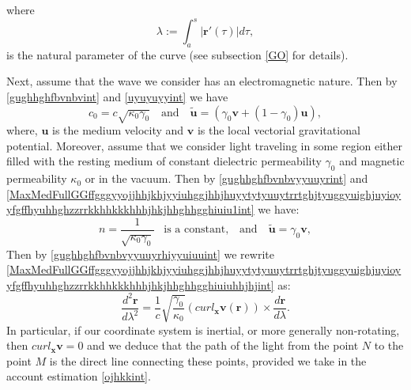 \documentclass{article}
\theoremstyle{definition}
\theoremstyle{remark}
\renewcommand{\vec}[1]{\mathbf{#1}}
\newcommand{\er}{\eqref}
\newcommand{\er}{\eqref}
\begin{document}
where
\begin{equation}\label{MaxMedFullGGffgggyyojjhhjkhjyyiuhggjhhjhuyytytyuuytrrtghjtyuggyuighjuyioyyfgffhyuhhghzzrrkkhhkkkhhhjhkjhhghhgghiuiuint}
\lambda:=\int_a^s\left|\vec r'(\tau)\right|d\tau,
\end{equation}
is the natural parameter of the curve (see subsection \ref{GO} for
details).


Next, assume that the wave we consider has an electromagnetic
nature. Then by \er{gughhghfbvnbvint} and \er{uyuyuyyint} we have
\begin{equation}\label{gughhghfbvnbvyyuuyrint}
c_0=c\sqrt{\kappa_0\gamma_0}\quad\text{and}\quad\vec {\tilde
u}=\left(\gamma_0\vec v+(1-\gamma_0)\vec u\right),
\end{equation}
where, $\vec u$ is the medium velocity and $\vec v$ is the local
vectorial gravitational potential. Moreover, assume that we consider
light traveling in some region either filled with the resting medium
of constant dielectric permeability $\gamma_0$ and magnetic
permeability $\kappa_0$ or in the vacuum. Then by
\er{gughhghfbvnbvyyuuyrint} and
\er{MaxMedFullGGffgggyyojjhhjkhjyyiuhggjhhjhuyytytyuuytrrtghjtyuggyuighjuyioyyfgffhyuhhghzzrrkkhhkkkhhhjhkjhhghhgghiuiu1int}
we have:
\begin{equation}\label{gughhghfbvnbvyyuuyrhiyyuiuuint}
n=\frac{1}{\sqrt{\kappa_0\gamma_0}}\;\;\;\text{is a
constant,}\quad\text{and}\quad\vec {\tilde u}=\gamma_0\vec v,
\end{equation}
Then by \er{gughhghfbvnbvyyuuyrhiyyuiuuint} we rewrite
\er{MaxMedFullGGffgggyyojjhhjkhjyyiuhggjhhjhuyytytyuuytrrtghjtyuggyuighjuyioyyfgffhyuhhghzzrrkkhhkkkhhhjhkjhhghhgghiuiuhhjhjint}
as:
\begin{equation}\label{MaxMedFullGGffgggyyojjhhjkhjyyiuhggjhhjhuyytytyuuytrrtghjtyuggyuighjuyioyyfgffhyuhhghzzrrkkhhkkkhhhjhkjhhghhgghiuiuhhjhjiuiuyuint}
\frac{d^2\vec
r}{d\lambda^2}=\frac{1}{c}\sqrt{\frac{\gamma_0}{\kappa_0}}\left(curl_{\vec
x}\vec v\left(\vec r\right)\right)\times\frac{d\vec r}{d\lambda}.
\end{equation}
In particular, if our coordinate system is inertial, or more
generally non-rotating, then $curl_{\vec x}\vec v=0$ and we deduce
that the path of the light from the point $N$ to the point $M$ is
the direct line connecting these points, provided we take in the
account estimation \er{ojhkkint}.
\end{document}
